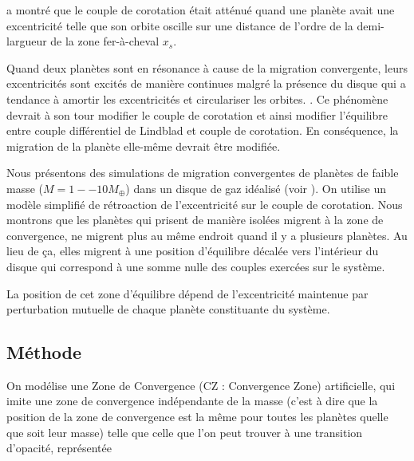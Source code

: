 \bigskip

\cite{bitsch2010orbital} a montré que le couple de corotation était atténué quand une planète avait une excentricité telle que son orbite oscille sur une distance de l'ordre de la demi-largueur de la zone fer-à-cheval $x_s$. 

Quand deux planètes sont en résonance à cause de la migration convergente, leurs excentricités sont excités de manière continues malgré la présence du disque qui a tendance à amortir les excentricités et circulariser les orbites. \citep[par exemple ][]{cresswell2008three}. Ce phénomène devrait à son tour modifier le couple de corotation et ainsi modifier l'équilibre entre couple différentiel de Lindblad et couple de corotation. En conséquence, la migration de la planète elle-même devrait être modifiée.

\bigskip

Nous présentons des simulations de migration convergentes de planètes de faible masse ($M=1--10\unit{M_\oplus}$) dans un disque de gaz idéalisé (voir ). On utilise un modèle simplifié de rétroaction de l'excentricité sur le couple de corotation. Nous montrons que les planètes qui prisent de manière isolées migrent à la zone de convergence, ne migrent plus au même endroit quand il y a plusieurs planètes. Au lieu de ça, elles migrent à une position d'équilibre décalée vers l'intérieur du disque qui correspond à une somme nulle des couples exercées sur le système. 

La position de cet zone d'équilibre dépend de l'excentricité maintenue par perturbation mutuelle de chaque planète constituante du système.

\subsection{Méthode}
On modélise une Zone de Convergence (CZ : Convergence Zone) artificielle, qui imite une zone de convergence indépendante de la masse (c'est à dire que la position de la zone de convergence est la même pour toutes les planètes quelle que soit leur masse) telle que celle que l'on peut trouver à une transition d'opacité, représentée 

